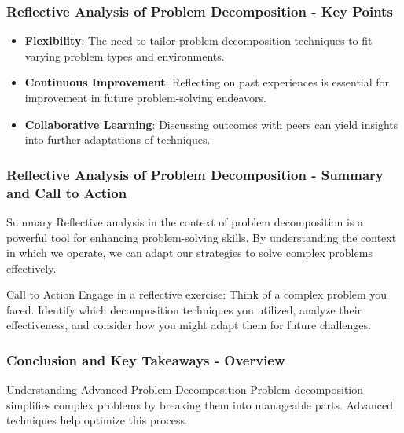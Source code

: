 \documentclass[aspectratio=169]{beamer}
\begin{document}
\begin{frame}[fragile]
    \frametitle{Reflective Analysis of Problem Decomposition - Key Points}
    \begin{itemize}
        \item \textbf{Flexibility}: The need to tailor problem decomposition techniques to fit varying problem types and environments.
        \item \textbf{Continuous Improvement}: Reflecting on past experiences is essential for improvement in future problem-solving endeavors.
        \item \textbf{Collaborative Learning}: Discussing outcomes with peers can yield insights into further adaptations of techniques.
    \end{itemize}
\end{frame}

\begin{frame}[fragile]
    \frametitle{Reflective Analysis of Problem Decomposition - Summary and Call to Action}
    \begin{block}{Summary}
      Reflective analysis in the context of problem decomposition is a powerful tool for enhancing problem-solving skills. By understanding the context in which we operate, we can adapt our strategies to solve complex problems effectively.
    \end{block}
    
    \begin{block}{Call to Action}
      Engage in a reflective exercise: Think of a complex problem you faced. Identify which decomposition techniques you utilized, analyze their effectiveness, and consider how you might adapt them for future challenges.
    \end{block}
\end{frame}

\begin{frame}[fragile]
    \frametitle{Conclusion and Key Takeaways - Overview}
    \begin{block}{Understanding Advanced Problem Decomposition}
        Problem decomposition simplifies complex problems by breaking them into manageable parts. Advanced techniques help optimize this process.
    \end{block}
\end{frame}
\end{document}
